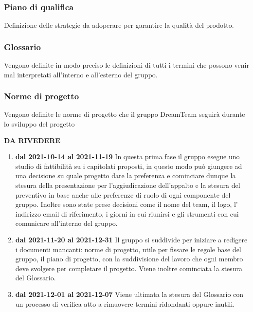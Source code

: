 \subsubsection{Piano di qualifica}
Definizione delle strategie da adoperare per garantire la qualità del prodotto.
\subsubsection{Glossario}
Vengono definite in modo preciso le definizioni di tutti i termini che possono venir mal interpretati all'interno e all’esterno del gruppo.
\subsubsection{Norme di progetto}
Vengono definite le norme di progetto che il gruppo DreamTeam seguirà durante lo sviluppo del progetto

\textbf{DA RIVEDERE}
\begin{enumerate}
\item \textbf{dal 2021-10-14 al 2021-11-19} In questa prima fase il gruppo esegue uno studio di fattibilità su i capitolati proposti, in questo modo può giungere ad una decisione su quale progetto dare la preferenza e cominciare dunque la stesura della presentazione per l’aggiudicazione dell’appalto e la stesura del preventivo in base anche alle preferenze di ruolo di ogni componente del gruppo. Inoltre sono state prese decisioni come il nome del team, il logo, l’ indirizzo email di riferimento, i giorni in cui riunirsi e gli strumenti con cui comunicare all’interno del gruppo.

\item \textbf{dal 2021-11-20 al 2021-12-31} Il gruppo si suddivide per iniziare a redigere i documenti mancanti: norme di progetto, utile per fissare le regole base del gruppo, il piano di progetto, con la suddivisione del lavoro che ogni membro deve svolgere per completare il progetto. Viene inoltre cominciata la stesura del Glossario.

\item \textbf{dal 2021-12-01 al 2021-12-07} Viene ultimata la stesura del Glossario con un processo di verifica atto a rimuovere termini ridondanti oppure inutili.

\end{enumerate}
